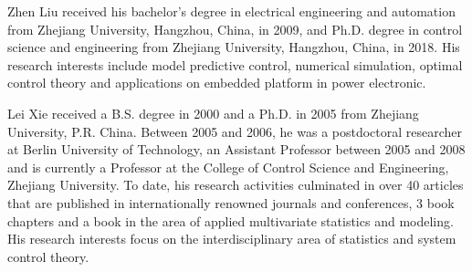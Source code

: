 \documentclass[journal]{IEEEtran}
\begin{document}
%
\begin{IEEEbiography}{Zhen Liu}
received his bachelor's degree in electrical engineering and automation from Zhejiang University, Hangzhou, China, in 2009, and Ph.D. degree in control science and engineering from Zhejiang University, Hangzhou, China, in 2018. His research interests include model predictive control, numerical simulation, optimal control theory and applications on embedded platform in power electronic.
\end{IEEEbiography}
\begin{IEEEbiography}{Lei Xie}
 received a B.S. degree in 2000 and a Ph.D. in 2005 from Zhejiang University, P.R. China. Between 2005 and 2006, he was a postdoctoral researcher at Berlin University of Technology, an Assistant Professor between 2005 and 2008 and is currently a Professor at the College of Control Science and Engineering, Zhejiang University. To date, his research activities culminated in over 40 articles that are published in internationally renowned journals and conferences, 3 book chapters and a book in the area of applied multivariate statistics and modeling. His research interests focus on the interdisciplinary area of statistics and system control theory.
\end{IEEEbiography}
\end{document}
